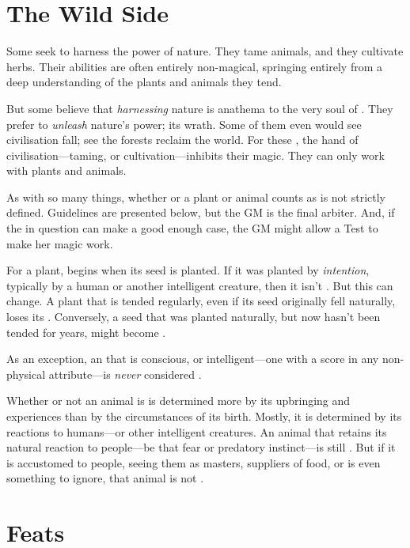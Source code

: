 
\section{The Wild Side}

Some  seek to harness the power of nature.
They tame animals, and they cultivate herbs.
Their abilities are often entirely non-magical, springing entirely from a deep understanding of the plants and animals they tend.

But some believe that \emph{harnessing} nature is anathema to the very soul of .
They prefer to \emph{unleash} nature's power; its wrath.
Some of them even would see civilisation fall; see the forests reclaim the world.
For these , the hand of civilisation---taming, or cultivation---inhibits their magic.
They can only work with {\wild} plants and animals.

As with so many things, whether or a plant or animal counts as {\wild} is not strictly defined.
Guidelines are presented below, but the GM is the final arbiter.
And, if the  in question can make a good enough case, the GM might allow a Test to make her magic work.

For a plant, {\wildness} begins when its seed is planted.
If it was planted by \emph{intention}, typically by a human or another intelligent creature, then it isn't {\wild}.
But this can change.
A plant that is tended regularly, even if its seed originally fell naturally, loses its {\wildness}.
Conversely, a seed that was planted naturally, but now hasn't been tended for years, might become {\wild}.

As an exception, an  that is conscious, or intelligent---one with a score in any non-physical attribute---is \emph{never} considered {\wild}.

Whether or not an animal is {\wild} is determined more by its upbringing and experiences than by the circumstances of its birth.
Mostly, it is determined by its reactions to humans---or other intelligent creatures.
An animal that retains its natural reaction to people---be that fear or predatory instinct---is still {\wild}.
But if it is accustomed to people, seeing them as masters, suppliers of food, or is even something to ignore, that animal is not {\wild}.

\section{Feats}

